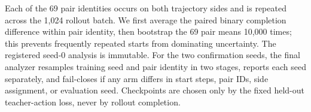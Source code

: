 \documentclass[conference]{IEEEtran}
\newif\ifethreeseed
\begin{document}
Each of the 69 pair identities occurs on both trajectory sides and is repeated across
the 1,024 rollout batch.  We first average the paired binary completion difference
within pair identity, then bootstrap the 69 pair means 10,000 times; this prevents
frequently repeated starts from dominating uncertainty.  The registered seed-0
analysis is immutable.  For the two confirmation seeds, the final analyzer resamples
training seed and pair identity in two stages, reports each seed separately, and
fail-closes if any arm differs in start steps, pair IDs, side assignment, or evaluation
seed.  Checkpoints are chosen only by the fixed held-out teacher-action loss, never by
rollout completion.

\ifethreeseed
The training-seed contrasts are A--T $\EATSeedZero$, $\EATSeedOne$, and
$\EATSeedTwo$, and A--S $\EASSeedZero$, $\EASSeedOne$, and $\EASSeedTwo$ for seeds
0--2, respectively.  These values expose seed consistency rather than relying on the
aggregate alone.
\fi

\ifethreeseed
  \IfFileExists{e70_effect_figure.tex}{}{%
    \PackageWarning{snmr}{Final E70 effect figure fragment is absent}%
  }
\else
  \ifdefined\EEffectFigurePreviewFile
    
  \fi
\fi
\end{document}

